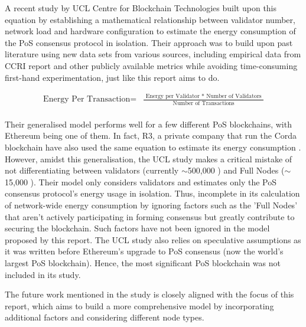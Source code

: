 A recent study by UCL Centre for Blockchain Technologies \cite{PlattDiscussionProof-of-Work} built upon this equation by establishing a mathematical relationship between validator number, network load and hardware configuration to estimate the energy consumption of the PoS consensus protocol in isolation. Their approach was to build upon past literature using new data sets from various sources, including empirical data from CCRI report \cite{CryptoCarbonRatingsInstitute2022TheNetwork} and other publicly available metrics while avoiding time-consuming first-hand experimentation, just like this report aims to do. 

\begin{align}
   \boldsymbol{\mathrm{\text{Energy Per Transaction} = }}
   &\boldsymbol{\mathrm{\frac{\text{ Energy per Validator }* \text{ Number of Validators } }{\text{ Number of Transactions }}} } \nonumber\\ \nonumber
\end{align}

Their generalised model performs well for a few different PoS blockchains, with Ethereum being one of them. In fact, R3, a private company that run the Corda blockchain have also used the same equation to estimate its energy consumption \cite{JustBlog}. However, amidst this generalisation, the UCL study makes a critical mistake of not differentiating between validators (currently $\sim$500,000 \cite{EthereumEthereum.orgc}) and Full Nodes ($\sim$15,000 \cite{NodewatchAnalytics}). Their model only considers validators and estimates only the PoS consensus protocol’s energy usage in isolation. Thus, incomplete in its calculation of network-wide energy consumption by ignoring factors such as the 'Full Nodes' that aren't actively participating in forming consensus but greatly contribute to securing the blockchain. Such factors have not been ignored in the model proposed by this report. The UCL study also relies on speculative assumptions as it was written before Ethereum’s upgrade to PoS consensus (now the world’s largest PoS blockchain). Hence, the most significant PoS blockchain was not included in its study.

The future work mentioned in the study is closely aligned with the focus of this report, which aims to build a more comprehensive model by incorporating additional factors and considering different node types.


